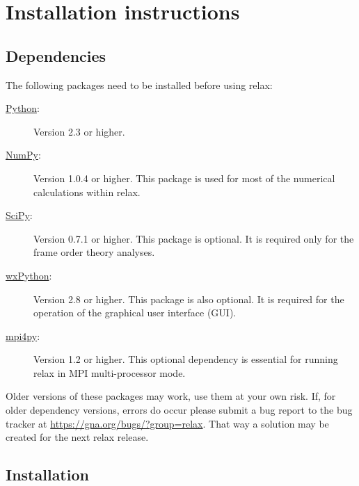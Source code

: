 
\chapter{Installation instructions}



\section{Dependencies}

The following packages need to be installed before using relax:

\begin{description}
\item[\href{http://python.org/}{Python}:]  Version 2.3 or higher.
\item[\href{http://numpy.scipy.org/}{NumPy}:]  Version 1.0.4 or higher.  This package is used for most of the numerical calculations within relax.
\item[\href{http://www.scipy.org/}{SciPy}:]  Version 0.7.1 or higher.  This package is optional.  It is required only for the frame order theory analyses.
\item[\href{http://www.scipy.org/}{wxPython}:]  Version 2.8 or higher.  This package is also optional.  It is required for the operation of the graphical user interface (GUI).
\item[\href{http://mpi4py.scipy.org/}{mpi4py}:]  Version 1.2 or higher.  This optional dependency is essential for running relax in MPI multi-processor mode.
\end{description}

Older versions of these packages may work, use them at your own risk.  If, for older dependency versions, errors do occur please submit a bug report to the bug tracker at \href{https://gna.org/bugs/?group=relax}{https://gna.org/bugs/?group=relax}.  That way a solution may be created for the next relax release.




\section{Installation}


